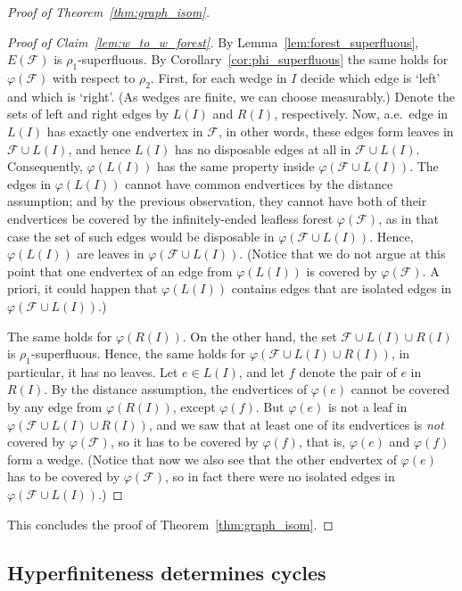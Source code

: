 \documentclass{article}
\theoremstyle{plain}
\theoremstyle{definition}
\newcommand{\cF}{\mathcal{F}}
\newcommand{\fg}{\varphi}
\begin{document}
\begin{proof}[Proof of Theorem~\ref{thm:graph_isom}]
\begin{proof}[Proof of Claim~\ref{lem:w_to_w_forest}]
        By Lemma~\ref{lem:forest_superfluous}, $E(\cF)$ is $\rho_1$-superfluous. By Corollary~\ref{cor:phi_superfluous} the same holds for $\fg(\cF)$ with respect to $\rho_2$. First, for each wedge in $I$ decide which edge is `left' and which is `right'. (As wedges are finite, we can choose measurably.) Denote the sets of left and right edges by $L(I)$ and $R(I)$, respectively. Now, a.e.\ edge in $L(I)$ has exactly one endvertex in $\cF$, in other words, these edges form leaves in $\cF\cup L(I)$, and hence $L(I)$ has no disposable edges at all in $\cF\cup L(I)$. Consequently, $\fg(L(I))$ has the same property inside $\varphi(\cF\cup L(I))$. The edges in $\fg(L(I))$ cannot have common endvertices by the distance assumption; and by the previous observation, they cannot have both of their endvertices be covered by the infinitely-ended leafless forest $\varphi(\cF)$, as in that case the set of such edges would be disposable in $\varphi(\cF\cup L(I))$. Hence, $\fg(L(I))$ are leaves in $\varphi(\cF\cup L(I))$. (Notice that we do not argue at this point that one endvertex of an edge from $\varphi(L(I))$ is covered by $\varphi(\cF)$. A priori, it could happen that $\varphi(L(I))$ contains edges that are isolated edges in $\varphi(\cF\cup L(I))$.)

        The same holds for $\fg(R(I))$. On the other hand, the set $\cF\cup L(I)\cup R(I)$ is $\rho_1$-superfluous. Hence, the same holds for $\varphi(\cF\cup L(I)\cup R(I))$, in particular, it has no leaves. Let $e \in L(I)$, and let $f$ denote the pair of $e$ in $R(I)$. By the distance assumption, the endvertices of $\varphi(e)$ cannot be covered by any edge from $\varphi(R(I))$, except $\varphi(f)$. But $\varphi(e)$ is not a leaf in $\varphi(\cF\cup L(I)\cup R(I))$, and we saw that at least one of its endvertices is \emph{not} covered by $\varphi(\cF)$, so it has to be covered by $\varphi(f)$, that is, $\varphi(e)$ and $\varphi(f)$ form a wedge. (Notice that now we also see that the other endvertex of $\varphi(e)$ has to be covered by $\varphi(\cF)$, so in fact there were no isolated edges in $\varphi(\cF\cup L(I))$.)
    \end{proof}
    This concludes the proof of Theorem~\ref{thm:graph_isom}.
\end{proof}


\subsection{Hyperfiniteness determines cycles} \label{subsec:hyperfinite_determines_cycle}
\end{document}
